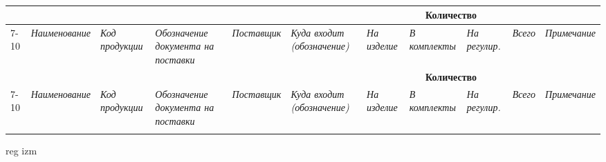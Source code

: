 \documentclass[a3paper,russian,utf8]{eskdgraph}
\begin{document}
\renewcommand{\tablename}{}
\setlength{\extrarowheight}{0,24cm} 
  \newcommand{\ltheadEquipment}{}
  \renewcommand{\ltheadEquipment}
    {
    \hline    
     &&&&&& \multicolumn{4}{c|}{\centering \textbf{Количество}}&\\
    \cline{7-10}
    \multicolumn{1}{|m{1cm}|}{\centering  \textit{№ стр.}}&
    \multicolumn{1}{m{6cm}|}{\centering   \textit{Наименование}}&
    \multicolumn{1}{m{3cm}|}{\centering  \textit{Код продукции}}&
    \multicolumn{1}{m{5cm}|}{\centering   \textit{Обозначение документа на поставки}}&
    \multicolumn{1}{m{4cm}|}{\centering   \textit{Поставщик}}& 
    \multicolumn{1}{m{6cm}|}{\centering   \textit{Куда входит (обозначение)}}& 
    \multicolumn{1}{m{1,6cm}|}{\centering   \textit{На изделие}}& 
    \multicolumn{1}{m{1,6cm}|}{\centering   \textit{В комплекты}}&
    \multicolumn{1}{m{1,6cm}|}{\centering   \textit{На регулир.}}&
    \multicolumn{1}{m{1,6cm}|}{\centering   \textit{Всего}}&
    \multicolumn{1}{m{2,4cm}|}{\centering   \textit{Примечание}}\\
    \hline
    }    

\begin{longtable} {|m{1cm}|m{6cm}|m{3cm}|m{5cm}|m{4cm}|m{6cm}|m{}|m{}|m{}|m{}|m{}|}

\caption{}
\label{tab:psitible}

\\
    \ltheadEquipment
    \endfirsthead 
    \ltheadEquipment
    \endhead
    \endfoot
    \endlastfoot



\end{longtable}




{
\newpage


reg izm
}
\end{document}
